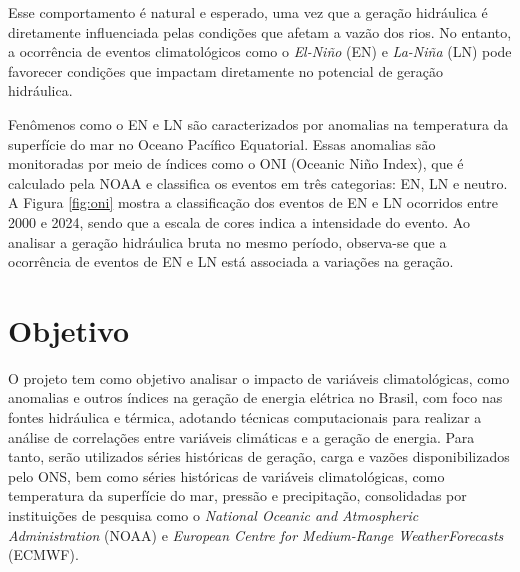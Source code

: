 \begin{figure}[!ht]
	{}
	{}
\end{figure}

Esse comportamento é natural e esperado, uma vez que a geração hidráulica é diretamente influenciada pelas condições
que afetam a vazão dos rios. No entanto, a ocorrência de eventos climatológicos como o \textit{El-Niño} (EN) e 
\textit{La-Niña} (LN) pode favorecer condições que impactam diretamente no potencial de geração hidráulica. \cite{de2012influencia}

Fenômenos como o EN e LN são caracterizados por anomalias na temperatura da superfície do mar no Oceano Pacífico
Equatorial. Essas anomalias são monitoradas por meio de índices como o ONI (Oceanic Niño Index), que é calculado
pela NOAA e classifica os eventos em três categorias: EN, LN e neutro. A Figura \ref{fig:oni} mostra a classificação
dos eventos de EN e LN ocorridos entre 2000 e 2024, sendo que a escala de cores indica a intensidade do evento. Ao
analisar a geração hidráulica bruta no mesmo período, observa-se que a ocorrência de eventos de EN e LN está associada
a variações na geração.

\begin{figure}[!ht]
	{}
	{}
\end{figure}

\section{Objetivo}
O projeto tem como objetivo analisar o impacto de variáveis climatológicas, como anomalias e outros índices na geração 
de energia elétrica no Brasil, com foco nas fontes hidráulica e térmica, adotando técnicas computacionais para realizar 
a análise de correlações entre variáveis climáticas e a geração de energia. Para tanto, serão utilizados séries 
históricas de geração, carga e vazões disponibilizados pelo ONS, bem como séries históricas de variáveis climatológicas,
 como temperatura da superfície do mar, pressão e precipitação, consolidadas por instituições de pesquisa como o
 \textit{National Oceanic and Atmospheric Administration} (NOAA) e 
 \textit{European Centre for Medium-Range WeatherForecasts} (ECMWF).


